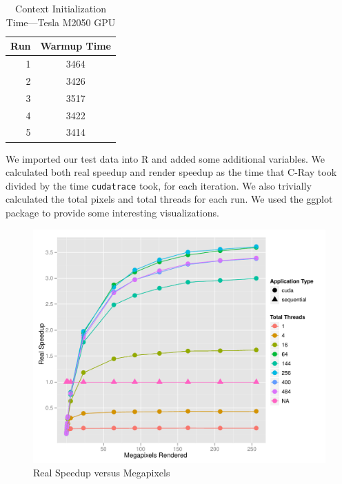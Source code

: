 \documentclass[12pt]{article}
\begin{document}
\begin{table}
    \caption{Context Initialization Time---Tesla M2050 GPU} \label{tab:warmup_time}
    \begin{center}
        \begin{tabular}{r | c}
            \toprule
            Run & Warmup Time \\
            \midrule
            1 & 3464 \\
            2 & 3426 \\
            3 & 3517 \\
            4 & 3422 \\
            5 & 3414 \\
            \bottomrule
        \end{tabular}
    \end{center}
\end{table}

We imported our test data into R and added some additional variables. We calculated both real speedup and render speedup as the time that C-Ray took divided by the time \texttt{cudatrace} took, for each iteration. We also trivially calculated the total pixels and total threads for each run. We used the ggplot package to provide some interesting visualizations.


\begin{figure}
    \caption{Real Speedup versus Megapixels} \label{fig:real_speedup}
    \begin{center}
\includegraphics{cudatrace-006}
    \end{center}
\end{figure}
\end{document}
